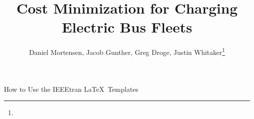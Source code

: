\documentclass[lettersize,journal]{IEEEtran}
\begin{document}
\title{Cost Minimization for Charging Electric Bus Fleets}
\author{Daniel Mortensen, Jacob Gunther, Greg Droge, Justin Whitaker\thanks{}}

%
{How to Use the IEEEtran \LaTeX \ Templates}

\maketitle 









\newpage
\printbibliography
\end{document}
